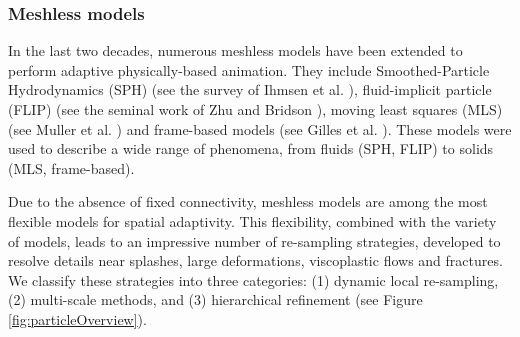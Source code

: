 \subsubsection{Meshless models}
\label{sec:meshless}
In the last two decades, numerous meshless models have been extended to perform adaptive physically-based animation. They include Smoothed-Particle Hydrodynamics (SPH) (see the survey of Ihmsen et al. \cite{Ihmsen2014:STAR}), fluid-implicit particle (FLIP) (see the seminal work of Zhu and Bridson \cite{Zhu2005}), moving least squares (MLS) (see Muller et al. \cite{Muller2004:melting}) and frame-based models (see Gilles et al. \cite{Gilles2011}). These models were used to describe a wide range of phenomena, from fluids (SPH, FLIP) to solids (MLS, frame-based).

Due to the absence of fixed connectivity, meshless models are among the most flexible models for spatial adaptivity. This flexibility, combined with the variety of models, leads to an impressive number of re-sampling strategies, developed to resolve details near splashes, large deformations, viscoplastic flows and fractures. We classify these strategies into three categories: (1) dynamic local re-sampling, (2) multi-scale methods, and (3) hierarchical refinement (see Figure \ref{fig:particleOverview}).
